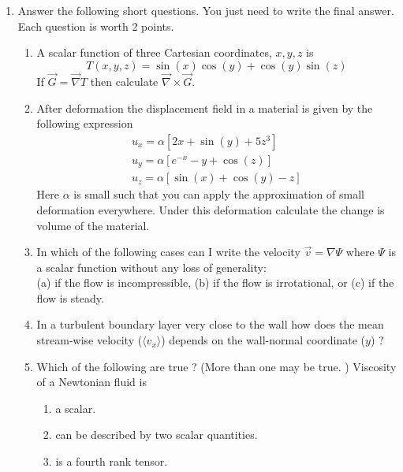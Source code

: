 \documentclass[12pt,a4paper]{article}
\begin{document}
\begin{enumerate}
\item
\label{prb3}
Answer the following short questions. You just need to write the final answer.
Each question is worth 2 points. 
  \begin{enumerate}
  \item A scalar function of three Cartesian coordinates, $x,y,z$ is 
    \begin{equation}
       T(x,y,z) = \sin(x)\cos(y) + \cos(y)\sin(z)
    \end{equation}
    If $\vec{G} = \vec{\nabla} T $ then calculate $\vec{\nabla}\times \vec{G}$.
  \item After deformation the displacement field in a material is given by the
    following expression
    \begin{eqnarray}
      u_x = \alpha [2x + \sin(y) + 5z^3 ] \\
      u_y = \alpha[ e^{-x} - y + \cos(z) ] \\
      u_z = \alpha[ \sin(x) + \cos(y) -z ]
    \end{eqnarray}
    Here $\alpha$ is small such that you can apply the approximation of small deformation
    everywhere. Under this deformation calculate the change is volume of the material.
  \item In which of the following cases can I write the velocity $\vec{v} = \nabla \Psi $ where $\Psi$ is a scalar function
    without any loss of generality: \\
    (a) if the flow is incompressible, (b) if the flow is irrotational, or (c) if the flow is steady.
  \item In a turbulent boundary layer very close to the wall how does the mean stream-wise
    velocity ($\langle v_x \rangle$) depends on the wall-normal coordinate ($y$) ? 
 \item Which of the following are true ? (More than one may be true. )
   Viscosity of a Newtonian fluid is
   \begin{enumerate}
   \item a scalar.
   \item can be described by two scalar quantities.
     \item is a fourth rank tensor. 
    \end{enumerate}
\end{enumerate}



\end{enumerate}
\end{document}
